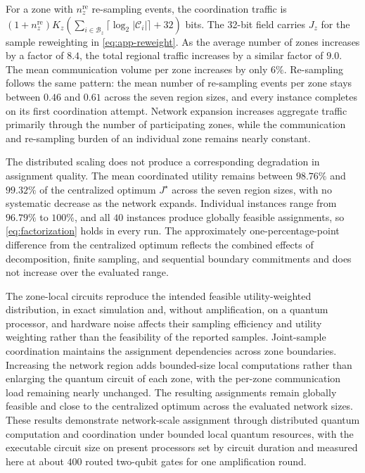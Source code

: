 For a zone with $n_z^{\mathrm{re}}$ re-sampling events, the coordination traffic is $(1+n_z^{\mathrm{re}})K_z (\sum_{i\in\mathcal B_z} \lceil\log_2|\mathcal C_i|\rceil+32)$ bits. The 32-bit field carries $J_z$ for the sample reweighting in \eqref{eq:app-reweight}. As the average number of zones increases by a factor of $8.4$, the total regional traffic increases by a similar factor of $9.0$. The mean communication volume per zone increases by only $6\%$. Re-sampling follows the same pattern: the mean number of re-sampling events per zone stays between $0.46$ and $0.61$ across the seven region sizes, and every instance completes on its first coordination attempt. Network expansion increases aggregate traffic primarily through the number of participating zones, while the communication and re-sampling burden of an individual zone remains nearly constant.

The distributed scaling does not produce a corresponding degradation in assignment quality. The mean coordinated utility remains between $98.76\%$ and $99.32\%$ of the centralized optimum $J^\star$ across the seven region sizes, with no systematic decrease as the network expands. Individual instances range from $96.79\%$ to $100\%$, and all $40$ instances produce globally feasible assignments, so \eqref{eq:factorization} holds in every run. The approximately one-percentage-point difference from the centralized optimum reflects the combined effects of decomposition, finite sampling, and sequential boundary commitments and does not increase over the evaluated range.

The zone-local circuits reproduce the intended feasible utility-weighted distribution, in exact simulation and, without amplification, on a quantum processor, and hardware noise affects their sampling efficiency and utility weighting rather than the feasibility of the reported samples. Joint-sample coordination maintains the assignment dependencies across zone boundaries. Increasing the network region adds bounded-size local computations rather than enlarging the quantum circuit of each zone, with the per-zone communication load remaining nearly unchanged. The resulting assignments remain globally feasible and close to the centralized optimum across the evaluated network sizes. These results demonstrate network-scale assignment through distributed quantum computation and coordination under bounded local quantum resources, with the executable circuit size on present processors set by circuit duration and measured here at about $400$ routed two-qubit gates for one amplification round.
